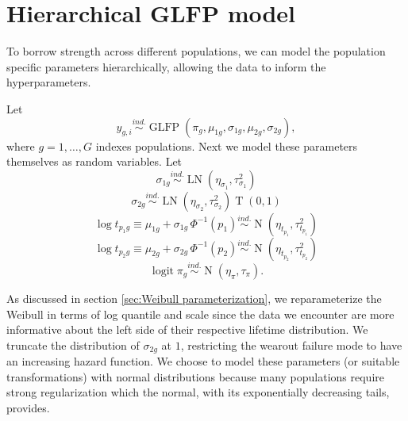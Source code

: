 \documentclass[12pt]{article}
\newcommand{\ind}{\stackrel{ind.}{\sim}}
\newcommand{\op}{\operatorname}
\begin{document}
\section{Hierarchical GLFP model}
\label{sec:Hierarchical GLFP model}

To borrow strength across different populations, we can model the population specific parameters hierarchically, allowing the data to inform the hyperparameters.

Let
\begin{equation}
y_{g,i} \ind \op{GLFP}\left( \pi_g, \mu_{1g}, \sigma_{1g}, \mu_{2g}, \sigma_{2g} \right),
\end{equation}
where $g=1,\ldots,G$ indexes populations. Next we model these parameters themselves as random variables. Let
\begin{equation*}
\sigma_{1g} \ind \op{LN} \left( \eta_{\sigma_1}, \tau^2_{\sigma_1} \right)
\end{equation*}
\begin{equation*}
\sigma_{2g} \ind \op{LN} \left( \eta_{\sigma_2}, \tau^2_{\sigma_2}\right)\op{T}\left(0, 1\right)
\end{equation*}
\begin{equation}
\label{eq:hier-model}
\log t_{p_{1}g} \equiv \mu_{1g} + \sigma_{1g}\,\Phi^{-1}(p_1)  \ind \op{N} \left(\eta_{t_{p_1}}, \tau^2_{t_{p_1}}\right)
\end{equation}
\begin{equation*}
\log t_{p_{2}g} \equiv \mu_{2g} + \sigma_{2g}\,\Phi^{-1}(p_2)  \ind \op{N} \left(\eta_{t_{p_2}}, \tau^2_{t_{p_2}}\right)
\end{equation*}
\begin{equation*}
\op{logit} \pi_g \ind \op{N}(\eta_\pi, \tau_\pi).
\end{equation*}

As discussed in section \ref{sec:Weibull parameterization}, we reparameterize the Weibull in terms of log quantile and scale since the data we encounter are more informative about the left side of their respective lifetime distribution. We truncate the distribution of $\sigma_{2g}$ at $1$, restricting the wearout failure mode to have an increasing hazard function. We choose to model these parameters (or suitable transformations) with normal distributions because many populations require strong regularization which the normal, with its exponentially decreasing tails, provides. 
\end{document}
